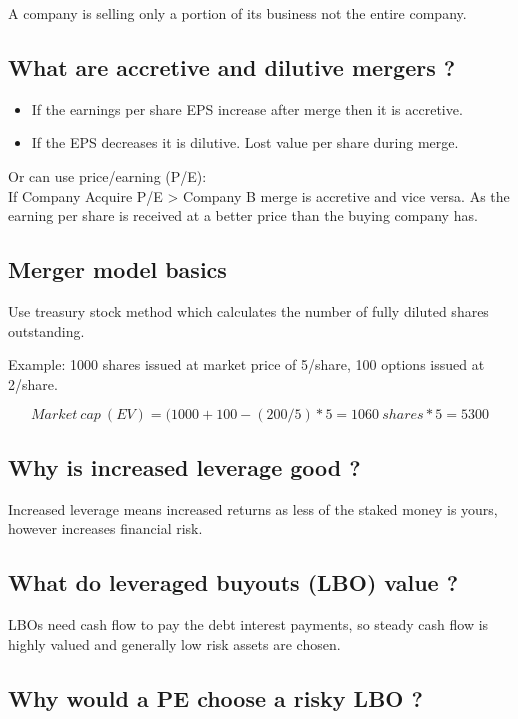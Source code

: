 \documentclass[11pt]{scrartcl} %
\begin{document}
A company is selling only a portion of its business not the entire company.

\subsection{What are accretive and dilutive mergers ?}

\begin{itemize}
	\item If the earnings per share EPS increase after merge then it is accretive.
	\item If the EPS decreases it is dilutive. Lost value per share during merge.
\end{itemize}

Or can use price/earning (P/E):\\

If Company Acquire P/E > Company B merge is accretive and vice versa. As the earning per share is received at a better price than the buying company has.

\subsection{Merger model basics}

Use treasury stock method which calculates the number of fully diluted shares outstanding.

Example: 1000 shares issued at market price of 5/share, 100 options issued at 2/share.

\[ Market\:cap\:(EV) = (1000 + 100 - (200/5)*5 = 1060\:shares *5 = 5300 \]

\subsection{Why is increased leverage good ?}

Increased leverage means increased returns as less of the staked money is yours, however increases financial risk.

\subsection{What do leveraged buyouts (LBO) value ?}

LBOs need cash flow to pay the debt interest payments, so steady cash flow is highly valued and generally low risk assets are chosen. 

\subsection{Why would a PE choose a risky LBO ?}
\end{document}

